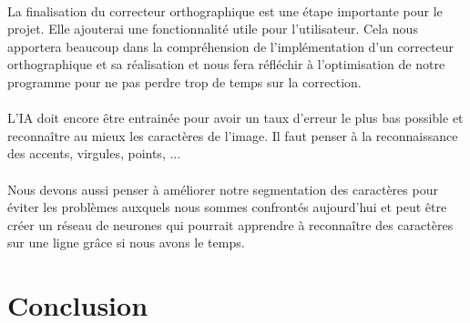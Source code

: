 \documentclass{article}
\begin{document}
\paragraph{}La finalisation du correcteur orthographique est une étape importante pour le projet. Elle ajouterai une fonctionnalité utile pour l'utilisateur. Cela nous apportera beaucoup dans la compréhension de l'implémentation d'un correcteur orthographique et sa réalisation et nous fera réfléchir à l'optimisation de notre programme pour ne pas perdre trop de temps sur la correction. 

\paragraph{}L'IA doit encore être entrainée pour avoir un taux d'erreur le plus bas possible et reconnaître au mieux les caractères de l'image. Il faut penser à la reconnaissance des accents, virgules, points, ...

\paragraph{}Nous devons aussi penser à améliorer notre segmentation des caractères pour éviter les problèmes auxquels nous sommes confrontés aujourd'hui et peut être créer un réseau de neurones qui pourrait apprendre à reconnaître des caractères sur une ligne grâce si nous avons le temps.

\newpage
{}
\section{Conclusion}

\newpage
\end{document}
